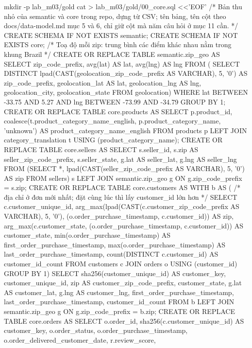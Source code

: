 \begin{codeblock}
mkdir -p lab_m03/gold
cat > lab_m03/gold/00_core.sql <<'EOF'
/* Bản thu nhỏ của semantic và core trong repo, dựng từ CSV; tên bảng, tên cột
   theo docs/data-model.md mục 5 và 6, chỉ giữ cột mà năm câu hỏi ở mục 11 cần. */
CREATE SCHEMA IF NOT EXISTS semantic;
CREATE SCHEMA IF NOT EXISTS core;
/* Toạ độ mỗi zip: trung bình các điểm khác nhau nằm trong khung Brazil */
CREATE OR REPLACE TABLE semantic.zip_geo AS
SELECT zip_code_prefix, avg(lat) AS lat, avg(lng) AS lng FROM (
  SELECT DISTINCT lpad(CAST(geolocation_zip_code_prefix AS VARCHAR), 5, '0')
           AS zip_code_prefix, geolocation_lat AS lat, geolocation_lng AS lng,
         geolocation_city, geolocation_state
  FROM geolocation)
WHERE lat BETWEEN -33.75 AND 5.27 AND lng BETWEEN -73.99 AND -34.79
GROUP BY 1;
CREATE OR REPLACE TABLE core.products AS
SELECT p.product_id, coalesce(t.product_category_name_english,
         p.product_category_name, 'unknown') AS product_category_name_english
FROM products p LEFT JOIN category_translation t USING (product_category_name);
CREATE OR REPLACE TABLE core.sellers AS
SELECT s.seller_id, s.zip AS seller_zip_code_prefix, s.seller_state,
       g.lat AS seller_lat, g.lng AS seller_lng
FROM (SELECT *, lpad(CAST(seller_zip_code_prefix AS VARCHAR), 5, '0') AS zip
      FROM sellers) s
LEFT JOIN semantic.zip_geo g ON g.zip_code_prefix = s.zip;
CREATE OR REPLACE TABLE core.customers AS
WITH b AS (  /* địa chỉ ở đơn mới nhất; đặt cùng lúc thì lấy customer_id lớn hơn */
  SELECT c.customer_unique_id,
         arg_max(lpad(CAST(c.customer_zip_code_prefix AS VARCHAR), 5, '0'),
                 (o.order_purchase_timestamp, c.customer_id)) AS zip,
         arg_max(c.customer_state, (o.order_purchase_timestamp, c.customer_id))
           AS customer_state,
         min(o.order_purchase_timestamp) AS first_order_purchase_timestamp,
         max(o.order_purchase_timestamp) AS last_order_purchase_timestamp,
         count(DISTINCT c.customer_id) AS customer_id_count
  FROM customers c JOIN orders o USING (customer_id) GROUP BY 1)
SELECT sha256(customer_unique_id) AS customer_key, customer_unique_id,
       zip AS customer_zip_code_prefix, customer_state,
       g.lat AS customer_lat, g.lng AS customer_lng,
       first_order_purchase_timestamp, last_order_purchase_timestamp,
       customer_id_count
FROM b LEFT JOIN semantic.zip_geo g ON g.zip_code_prefix = b.zip;
CREATE OR REPLACE TABLE core.orders AS
SELECT o.order_id, sha256(c.customer_unique_id) AS customer_key, o.order_status,
       o.order_purchase_timestamp, o.order_delivered_customer_date, r.review_score,

\end{codeblock}
